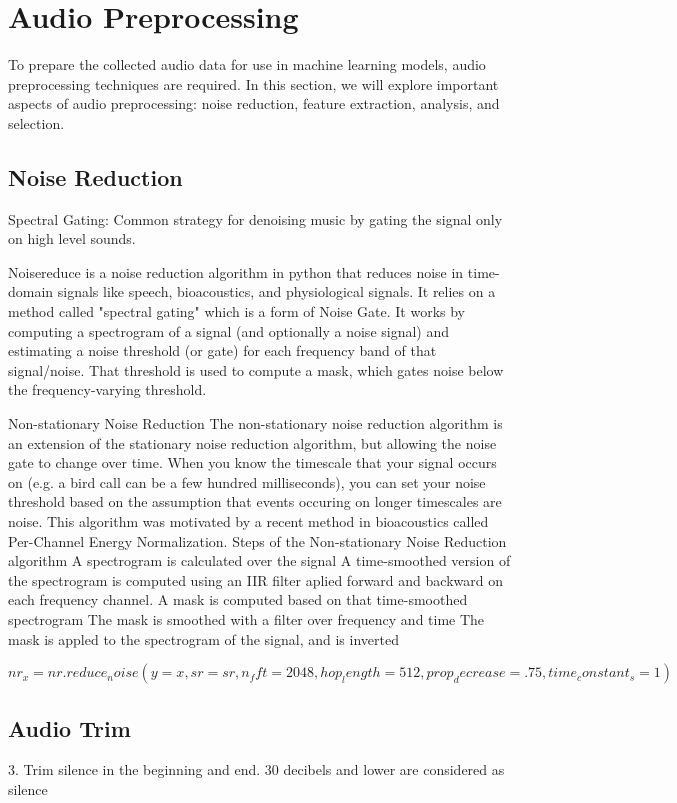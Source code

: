 \section{Audio Preprocessing}

To prepare the collected audio data for use in machine learning models, audio preprocessing techniques are required. In this section, we will explore important aspects of audio preprocessing: noise reduction, feature extraction, analysis, and selection.

\subsection{Noise Reduction}

Spectral Gating: Common strategy for denoising music by gating the signal only on high level sounds.

Noisereduce is a noise reduction algorithm in python that reduces noise in time-domain signals like speech, bioacoustics, and physiological signals. It relies on a method called "spectral gating" which is a form of Noise Gate. It works by computing a spectrogram of a signal (and optionally a noise signal) and estimating a noise threshold (or gate) for each frequency band of that signal/noise. That threshold is used to compute a mask, which gates noise below the frequency-varying threshold.

Non-stationary Noise Reduction
The non-stationary noise reduction algorithm is an extension of the stationary noise reduction algorithm, but allowing the noise gate to change over time.
When you know the timescale that your signal occurs on (e.g. a bird call can be a few hundred milliseconds), you can set your noise threshold based on the assumption that events occuring on longer timescales are noise.
This algorithm was motivated by a recent method in bioacoustics called Per-Channel Energy Normalization.
Steps of the Non-stationary Noise Reduction algorithm
A spectrogram is calculated over the signal
A time-smoothed version of the spectrogram is computed using an IIR filter aplied forward and backward on each frequency channel.
A mask is computed based on that time-smoothed spectrogram
The mask is smoothed with a filter over frequency and time
The mask is appled to the spectrogram of the signal, and is inverted

$nr_x = nr.reduce_noise(y=x, sr=sr, n_fft=2048, hop_length=512, prop_decrease=.75, time_constant_s=1)$


\subsection{Audio Trim}

3. Trim silence in the beginning and end.
30 decibels and lower are considered as silence

